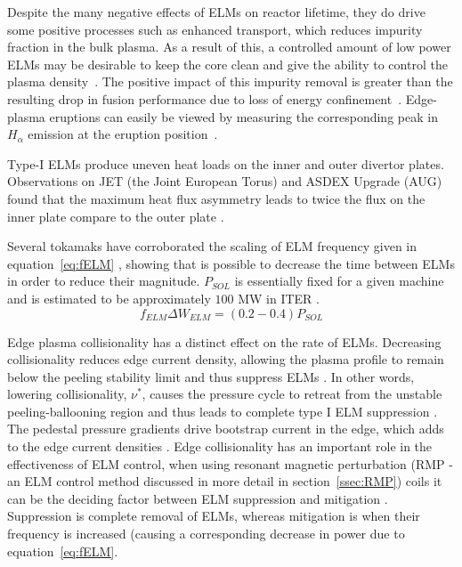 \documentclass[11pt, twocolumn]{article}  %
\newcommand{\citep}[1]{\cite{#1}}
\begin{document}
Despite the many negative effects of ELMs on reactor lifetime, they do drive some positive processes such as enhanced transport, which reduces impurity fraction in the bulk plasma. As a result of this, a controlled amount of low power ELMs may be desirable to keep the core clean and give the ability to control the plasma density~\citep{Hill1997}. The positive impact of this impurity removal is greater than the resulting drop in fusion performance due to loss of energy confinement~\cite{Connor2008}. Edge-plasma eruptions can easily be viewed by measuring the corresponding peak in $H_{\alpha}$ emission at the eruption position~\citep{Hill1997}.

Type-I ELMs produce uneven heat loads on the inner and outer divertor plates. Observations on JET (the Joint European Torus) and ASDEX Upgrade (AUG) found that the maximum heat flux asymmetry leads to twice the flux on the inner plate compare to the outer plate \cite{Eich2007}.

Several tokamaks have corroborated the scaling of ELM frequency given in equation~\ref{eq:fELM} \cite{Leonard1999, Loarte2002}, showing that is possible to decrease the time between ELMs in order to reduce their magnitude. $P_{SOL}$ is essentially fixed for a given machine and is estimated to be approximately $100$ MW in ITER \cite{Eich2013}.
\begin{equation}\label{eq:fELM}
f_{ELM}\Delta W_{ELM} = (0.2-0.4) P_{SOL}
\end{equation}

Edge plasma collisionality has a distinct effect on the rate of ELMs. Decreasing collisionality reduces edge current density, allowing the plasma profile to remain below the peeling stability limit and thus suppress ELMs \cite{Kirk2013}. In other words, lowering collisionality, $\nu^{*}$, causes the pressure cycle to retreat from the unstable peeling-ballooning region and thus leads to complete type I ELM suppression \cite{Evans2008}. The pedestal pressure gradients drive bootstrap current in the edge, which adds to the edge current densities \cite{Lang2013}. Edge collisionality has an important role in the effectiveness of ELM control, when using resonant magnetic perturbation (RMP - an ELM control method discussed in more detail in section~\ref{ssec:RMP}) coils it can be the deciding factor between ELM suppression and mitigation \cite{Kirk2013}. Suppression is complete removal of ELMs, whereas mitigation is when their frequency is increased (causing a corresponding decrease in power due to equation~\ref{eq:fELM}.
\end{document}
